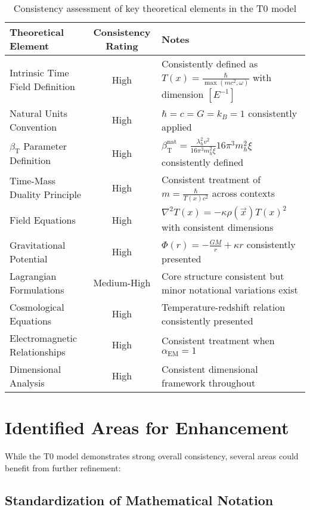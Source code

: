 \documentclass[a4paper,11pt]{article}
\newcommand{\Tfield}{T(x)}
\newcommand{\betaT}{\beta_{\text{T}}}
\newcommand{\alphaEM}{\alpha_{\text{EM}}}
\newcommand{\vecx}{\vec{x}}
\begin{document}
	\begin{table}[h]
		\centering
		\begin{tabularx}{\textwidth}{|X|c|X|}
			\hline
			\textbf{Theoretical Element} & \textbf{Consistency Rating} & \textbf{Notes} \\
			\hline
			Intrinsic Time Field Definition & High & Consistently defined as $\Tfield = \frac{\hbar}{\max(mc^2, \omega)}$ with dimension $[E^{-1}]$ \\
			\hline
			Natural Units Convention & High & $\hbar = c = G = k_B = 1$ consistently applied \\
			\hline
			$\betaT$ Parameter Definition & High & $\betaT^{\text{nat}} = \frac{\lambda_h^2 v^2}{16\pi^3 m_h^2 \xi}{16\pi^3 m_h^2 \xi}$ consistently defined \\
			\hline
			Time-Mass Duality Principle & High & Consistent treatment of $m = \frac{\hbar}{\Tfield c^2}$ across contexts \\
			\hline
			Field Equations & High & $\nabla^2 \Tfield = -\kappa \rho(\vecx) \Tfield^2$ with consistent dimensions \\
			\hline
			Gravitational Potential & High & $\Phi(r) = -\frac{GM}{r} + \kappa r$ consistently presented \\
			\hline
			Lagrangian Formulations & Medium-High & Core structure consistent but minor notational variations exist \\
			\hline
			Cosmological Equations & High & Temperature-redshift relation consistently presented \\
			\hline
			Electromagnetic Relationships & High & Consistent treatment when $\alphaEM = 1$ \\
			\hline
			Dimensional Analysis & High & Consistent dimensional framework throughout \\
			\hline
		\end{tabularx}
		\caption{Consistency assessment of key theoretical elements in the T0 model}
	\end{table}
	
	\section{Identified Areas for Enhancement}
	
	While the T0 model demonstrates strong overall consistency, several areas could benefit from further refinement:
	
	\subsection{Standardization of Mathematical Notation}
	
\end{document}
